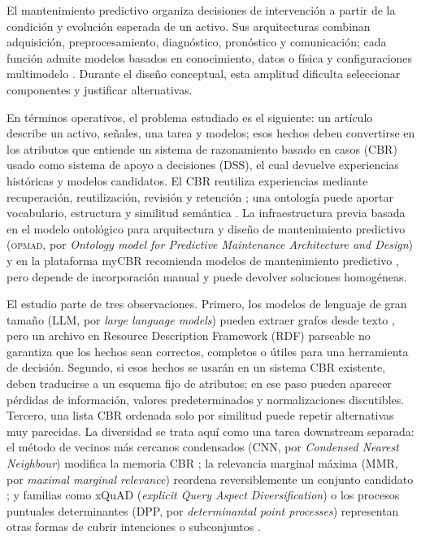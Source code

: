 \documentclass[11pt,a4paper]{article}
\newcommand{\OPMAD}{\textsc{opmad}}
\newcommand{\myCBR}{myCBR}
\begin{document}
El mantenimiento predictivo organiza decisiones de intervención a partir de la condición y evolución esperada de un activo. Sus arquitecturas combinan adquisición, preprocesamiento, diagnóstico, pronóstico y comunicación; cada función admite modelos basados en conocimiento, datos o física y configuraciones multimodelo \citep{MonteroJimenez2020Survey}. Durante el diseño conceptual, esta amplitud dificulta seleccionar componentes y justificar alternativas.

En términos operativos, el problema estudiado es el siguiente: un artículo describe un activo, señales, una tarea y modelos; esos hechos deben convertirse en los atributos que entiende un sistema de razonamiento basado en casos (CBR) usado como sistema de apoyo a decisiones (DSS), el cual devuelve experiencias históricas y modelos candidatos. El CBR reutiliza experiencias mediante recuperación, reutilización, revisión y retención \citep{Aamodt1994CBR,LopezDeMantaras2005CBR}; una ontología puede aportar vocabulario, estructura y similitud semántica \citep{Gruber1993Ontology,AmailefLu2013OntologyCBR,Qin2018OntologyCBR}. La infraestructura previa basada en el modelo ontológico para arquitectura y diseño de mantenimiento predictivo (\OPMAD{}, por \emph{Ontology model for Predictive Maintenance Architecture and Design}) y en la plataforma \myCBR{} recomienda modelos de mantenimiento predictivo \citep{MonteroJimenez2021OPMADCBR,MunozHernandez2021OntologyCBR}, pero depende de incorporación manual y puede devolver soluciones homogéneas.

El estudio parte de tres observaciones. Primero, los modelos de lenguaje de gran tamaño (LLM, por \emph{large language models}) pueden extraer grafos desde texto \citep{Pan2024LLMKG,Lairgi2024IText2KG}, pero un archivo en Resource Description Framework (RDF) parseable no garantiza que los hechos sean correctos, completos o útiles para una herramienta de decisión. Segundo, si esos hechos se usarán en un sistema CBR existente, deben traducirse a un esquema fijo de atributos; en ese paso pueden aparecer pérdidas de información, valores predeterminados y normalizaciones discutibles. Tercero, una lista CBR ordenada solo por similitud puede repetir alternativas muy parecidas. La diversidad se trata aquí como una tarea downstream separada: el método de vecinos más cercanos condensados (CNN, por \emph{Condensed Nearest Neighbour}) modifica la memoria CBR \citep{MunozPena2025Diversity}; la relevancia marginal máxima (MMR, por \emph{maximal marginal relevance}) reordena reversiblemente un conjunto candidato \citep{CarbonellGoldstein1998MMR}; y familias como xQuAD (\emph{explicit Query Aspect Diversification}) o los procesos puntuales determinantes (DPP, por \emph{determinantal point processes}) representan otras formas de cubrir intenciones o subconjuntos \citep{Santos2010xQuAD,Gan2020DPP}.
\end{document}
